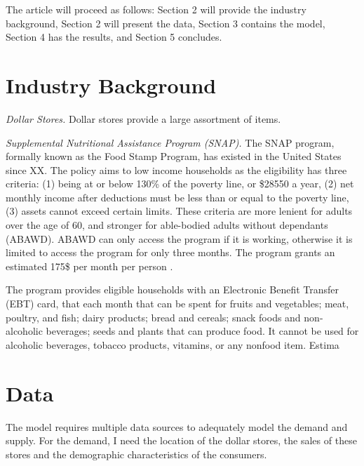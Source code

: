 \documentclass[11.5pt]{article}
\begin{document}
The article will proceed as follows: Section 2 will provide the industry background, Section 2 will present the data, Section 3 contains the model, Section 4 has the results, and Section 5 concludes.

\section{Industry Background}

\textit{Dollar Stores.} Dollar stores provide a large assortment of items.



\textit{Supplemental Nutritional Assistance Program (SNAP).} The SNAP program, formally known as the Food Stamp Program, has existed in the United States since XX. The policy aims to low income households as the eligibility  has three criteria: (1) being at or below 130\% of the poverty line, or \$28550 a year, (2) net monthly income after deductions must be less than or equal to the poverty line, (3) assets cannot exceed certain limits. These criteria are more lenient for adults over the age of 60, and stronger for able-bodied adults without dependants (ABAWD). ABAWD can only access the program if it is working, otherwise it is limited to access the program for only three months. The program grants an estimated 175\$ per month per person \cite{usda2021snap}.

The program provides eligible households with an Electronic Benefit Transfer (EBT) card, that each month that can be spent for fruits and vegetables; meat, poultry, and fish; dairy products; bread and cereals; snack foods and non-alcoholic beverages; seeds and plants that can produce food. It cannot be used for alcoholic beverages, tobacco products, vitamins, or any nonfood item. Estima









\section{Data}


The model requires multiple data sources to adequately model the demand and supply. For the demand, I need the location of the dollar stores, the sales of these stores and the demographic characteristics of the consumers. 
\end{document}
